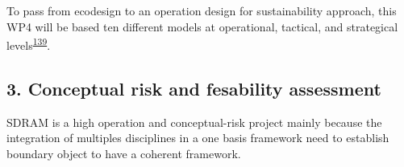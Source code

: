 \documentclass[
  12pt,
  a4paperpaper,
  onecolumn]{article}
\begin{document}
To pass from ecodesign to an operation design for sustainability
approach, this WP4 will be based ten different models at operational,
tactical, and strategical
levels\textsuperscript{\protect\hyperlink{ref-SousaRocha2019}{139}}.

\hypertarget{conceptual-risk-and-fesability-assessment}{%
\subsection{3. Conceptual risk and fesability
assessment}\label{conceptual-risk-and-fesability-assessment}}

SDRAM is a high operation and conceptual-risk project mainly because the
integration of multiples disciplines in a one basis framework need to
establish boundary object to have a coherent framework.

\small
\end{document}
